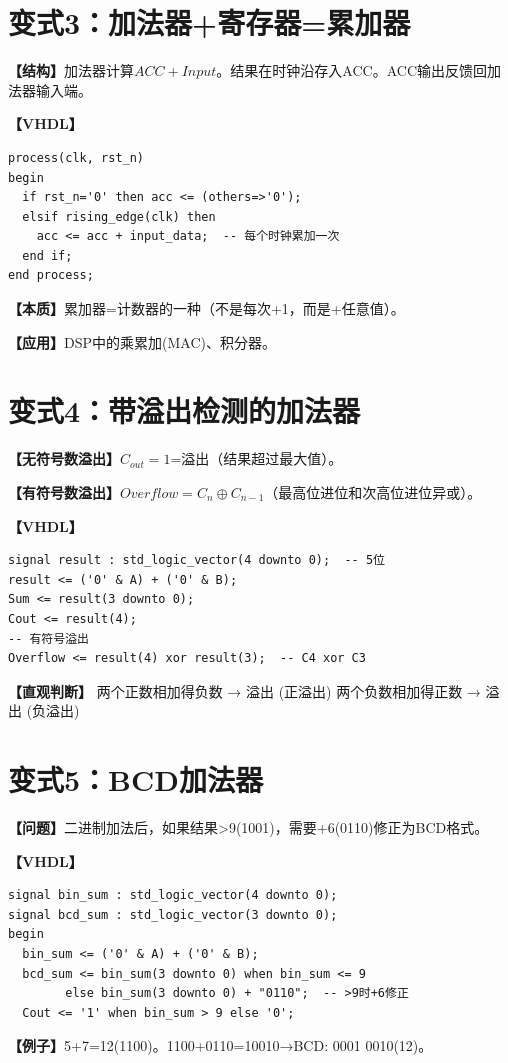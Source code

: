 \section{变式3：加法器+寄存器=累加器}

\begin{detailbox}[完整教学]
\textbf{【结构】}加法器计算$ACC+Input$。结果在时钟沿存入ACC。ACC输出反馈回加法器输入端。

\textbf{【VHDL】}
\begin{lstlisting}
process(clk, rst_n)
begin
  if rst_n='0' then acc <= (others=>'0');
  elsif rising_edge(clk) then
    acc <= acc + input_data;  -- 每个时钟累加一次
  end if;
end process;
\end{lstlisting}

\textbf{【本质】}累加器=计数器的一种（不是每次+1，而是+任意值）。

\textbf{【应用】}DSP中的乘累加(MAC)、积分器。
\end{detailbox}


\section{变式4：带溢出检测的加法器}

\begin{detailbox}[完整教学]
\textbf{【无符号数溢出】}$C_{out}=1$=溢出（结果超过最大值）。

\textbf{【有符号数溢出】}$Overflow = C_n \oplus C_{n-1}$（最高位进位和次高位进位异或）。

\textbf{【VHDL】}
\begin{lstlisting}
signal result : std_logic_vector(4 downto 0);  -- 5位
result <= ('0' & A) + ('0' & B);
Sum <= result(3 downto 0);
Cout <= result(4);
-- 有符号溢出
Overflow <= result(4) xor result(3);  -- C4 xor C3
\end{lstlisting}

\textbf{【直观判断】}
两个正数相加得负数 → 溢出 (正溢出)
两个负数相加得正数 → 溢出 (负溢出)
\end{detailbox}


\section{变式5：BCD加法器}

\begin{detailbox}[完整教学]
\textbf{【问题】}二进制加法后，如果结果>9(1001)，需要+6(0110)修正为BCD格式。

\textbf{【VHDL】}
\begin{lstlisting}
signal bin_sum : std_logic_vector(4 downto 0);
signal bcd_sum : std_logic_vector(3 downto 0);
begin
  bin_sum <= ('0' & A) + ('0' & B);
  bcd_sum <= bin_sum(3 downto 0) when bin_sum <= 9
        else bin_sum(3 downto 0) + "0110";  -- >9时+6修正
  Cout <= '1' when bin_sum > 9 else '0';
\end{lstlisting}

\textbf{【例子】}5+7=12(1100)。1100+0110=10010→BCD: 0001 0010(12)。
\end{detailbox}
